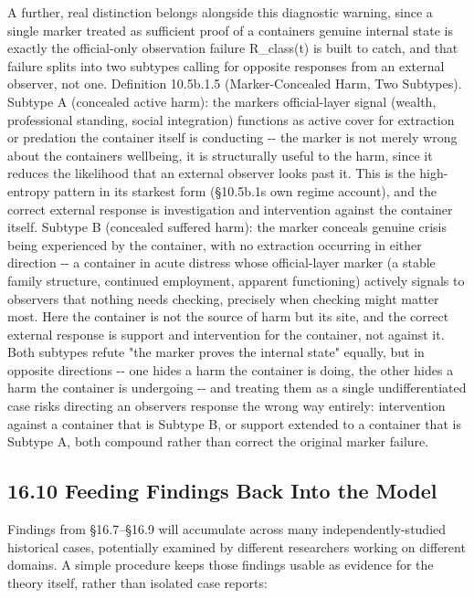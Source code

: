 \documentclass[
]{article}
\begin{document}
A further, real distinction belongs alongside this diagnostic warning,
since a single marker treated as sufficient proof of a containers
genuine internal state is exactly the official-only observation failure
R\_class(t) is built to catch, and that failure splits into two subtypes
calling for opposite responses from an external observer, not one.
Definition 10.5b.1.5 (Marker-Concealed Harm, Two Subtypes). Subtype A
(concealed active harm): the markers official-layer signal (wealth,
professional standing, social integration) functions as active cover for
extraction or predation the container itself is conducting -\/- the
marker is not merely wrong about the containers wellbeing, it is
structurally useful to the harm, since it reduces the likelihood that an
external observer looks past it. This is the high-entropy pattern in its
starkest form (§10.5b.1s own regime account), and the correct external
response is investigation and intervention against the container itself.
Subtype B (concealed suffered harm): the marker conceals genuine crisis
being experienced by the container, with no extraction occurring in
either direction -\/- a container in acute distress whose official-layer
marker (a stable family structure, continued employment, apparent
functioning) actively signals to observers that nothing needs checking,
precisely when checking might matter most. Here the container is not the
source of harm but its site, and the correct external response is
support and intervention for the container, not against it. Both
subtypes refute "the marker proves the internal state" equally, but in
opposite directions -\/- one hides a harm the container is doing, the
other hides a harm the container is undergoing -\/- and treating them as
a single undifferentiated case risks directing an observers response the
wrong way entirely: intervention against a container that is Subtype B,
or support extended to a container that is Subtype A, both compound
rather than correct the original marker failure.

\hypertarget{feeding-findings-back-into-the-model}{%
\subsection{16.10 Feeding Findings Back Into the
Model}\label{feeding-findings-back-into-the-model}}

Findings from §16.7--§16.9 will accumulate across many
independently-studied historical cases, potentially examined by
different researchers working on different domains. A simple procedure
keeps those findings usable as evidence for the theory itself, rather
than isolated case reports:
\end{document}
